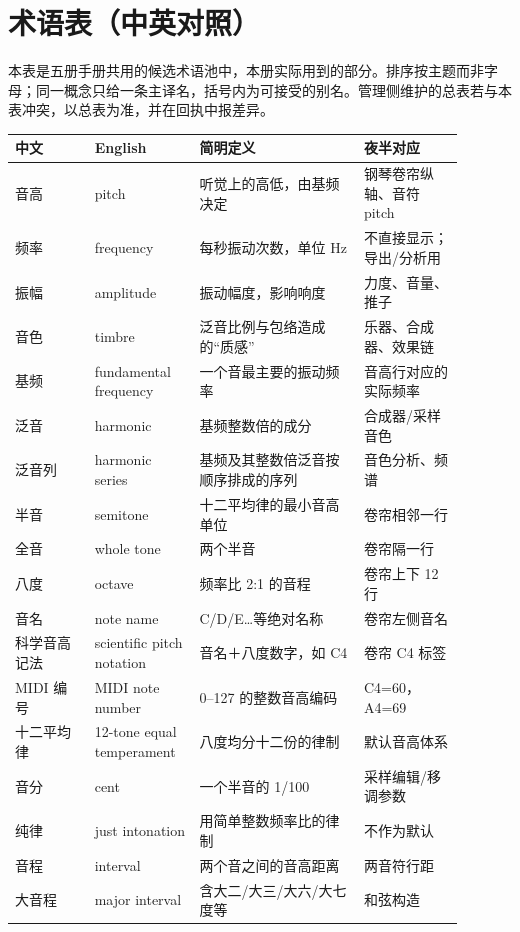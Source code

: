 \section{术语表（中英对照）}
\label{app:terms}

本表是五册手册共用的候选术语池中，本册实际用到的部分。排序按主题而非字母；同一概念只给一条主译名，括号内为可接受的别名。管理侧维护的总表若与本表冲突，以总表为准，并在回执中报差异。

\begin{center}
\footnotesize
\setlength{\tabcolsep}{3pt}
\begin{longtable}{p{0.16\linewidth}p{0.20\linewidth}p{0.33\linewidth}p{0.20\linewidth}}
\toprule
中文 & English & 简明定义 & 夜半对应 \\
\midrule
\endhead
音高 & pitch & 听觉上的高低，由基频决定 & 钢琴卷帘纵轴、音符 pitch \\
频率 & frequency & 每秒振动次数，单位 Hz & 不直接显示；导出/分析用 \\
振幅 & amplitude & 振动幅度，影响响度 & 力度、音量、推子 \\
音色 & timbre & 泛音比例与包络造成的“质感” & 乐器、合成器、效果链 \\
基频 & fundamental frequency & 一个音最主要的振动频率 & 音高行对应的实际频率 \\
泛音 & harmonic & 基频整数倍的成分 & 合成器/采样音色 \\
泛音列 & harmonic series & 基频及其整数倍泛音按顺序排成的序列 & 音色分析、频谱 \\
半音 & semitone & 十二平均律的最小音高单位 & 卷帘相邻一行 \\
全音 & whole tone & 两个半音 & 卷帘隔一行 \\
八度 & octave & 频率比 2:1 的音程 & 卷帘上下 12 行 \\
音名 & note name & C/D/E…等绝对名称 & 卷帘左侧音名 \\
科学音高记法 & scientific pitch notation & 音名＋八度数字，如 C4 & 卷帘 C4 标签 \\
MIDI 编号 & MIDI note number & 0–127 的整数音高编码 & C4=60，A4=69 \\
十二平均律 & 12-tone equal temperament & 八度均分十二份的律制 & 默认音高体系 \\
音分 & cent & 一个半音的 1/100 & 采样编辑/移调参数 \\
纯律 & just intonation & 用简单整数频率比的律制 & 不作为默认 \\
音程 & interval & 两个音之间的音高距离 & 两音符行距 \\
大音程 & major interval & 含大二/大三/大六/大七度等 & 和弦构造 \\

\end{longtable}
\end{center}
